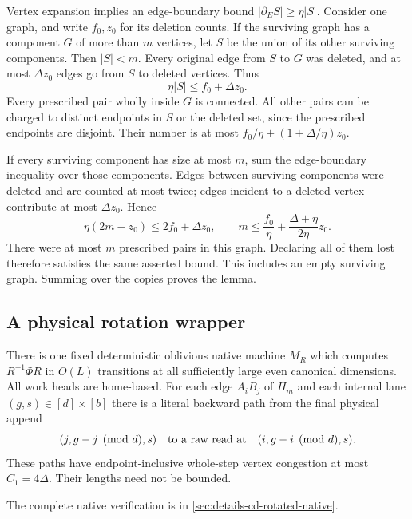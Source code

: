 \begin{outline}
Vertex expansion implies an edge-boundary bound $|\partial_E S|\ge\eta|S|$.
Consider one graph, and write $f_0,z_0$ for its deletion counts.  If the
surviving graph has a component $G$ of more than $m$ vertices, let $S$ be
the union of its other surviving components.  Then $|S|<m$.  Every original
edge from $S$ to $G$ was deleted, and at most $\Delta z_0$ edges go from
$S$ to deleted vertices.  Thus
\[
 \eta|S|\le f_0+\Delta z_0.
\]
Every prescribed pair wholly inside $G$ is connected.  All other pairs
can be charged to distinct endpoints in $S$ or the deleted set, since the
prescribed endpoints are disjoint.  Their number is at most
$f_0/\eta+(1+\Delta/\eta)z_0$.

If every surviving component has size at most $m$, sum the edge-boundary
inequality over those components.  Edges between surviving components
were deleted and are counted at most twice; edges incident to a deleted
vertex contribute at most $\Delta z_0$.  Hence
\[
 \eta(2m-z_0)\le2f_0+\Delta z_0,
 \qquad
 m\le\frac{f_0}{\eta}+\frac{\Delta+\eta}{2\eta}z_0.
\]
There were at most $m$ prescribed pairs in this graph.  Declaring all of
them lost therefore satisfies the same asserted bound.  This includes an
empty surviving graph.  Summing over the copies proves the lemma.
\end{outline}

\subsection{A physical rotation wrapper}

\begin{proposition}\label{prop:cd-rotated-native}
\notformalized
There is one fixed deterministic oblivious native machine $M_R$ which
computes $R^{-1}\Phi R$ in $O(L)$ transitions at all sufficiently large
even canonical dimensions.  All work heads are home-based.  For each
edge $A_iB_j$ of $H_m$ and each internal lane $(g,s)\in[d]\times[b]$
there is a literal backward path from the final physical append
\[
 (j,g-j\pmod d,s)
 \quad\hbox{to a raw read at}\quad
 (i,g-i\pmod d,s).
\]
These paths have endpoint-inclusive whole-step vertex congestion at most
$C_1=4\Delta$.  Their lengths need not be bounded.
\end{proposition}

The complete native verification is in \cref{sec:details-cd-rotated-native}.


